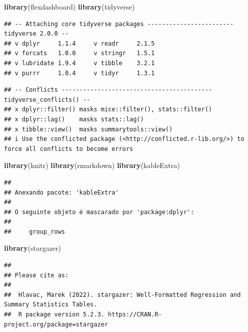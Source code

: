 \documentclass[
]{article}
\newenvironment{Shaded}{\begin{snugshade}}{\end{snugshade}}
\newcommand{\FunctionTok}[1]{\textcolor[rgb]{0.13,0.29,0.53}{\textbf{#1}}}
\newcommand{\NormalTok}[1]{#1}
\begin{document}
\begin{Shaded}
\begin{Highlighting}[]
\FunctionTok{library}\NormalTok{(flexdashboard)}
\FunctionTok{library}\NormalTok{(tidyverse)}
\end{Highlighting}
\end{Shaded}

\begin{verbatim}
## -- Attaching core tidyverse packages ------------------------ tidyverse 2.0.0 --
## v dplyr     1.1.4     v readr     2.1.5
## v forcats   1.0.0     v stringr   1.5.1
## v lubridate 1.9.4     v tibble    3.2.1
## v purrr     1.0.4     v tidyr     1.3.1
\end{verbatim}

\begin{verbatim}
## -- Conflicts ------------------------------------------ tidyverse_conflicts() --
## x dplyr::filter() masks mice::filter(), stats::filter()
## x dplyr::lag()    masks stats::lag()
## x tibble::view()  masks summarytools::view()
## i Use the conflicted package (<http://conflicted.r-lib.org/>) to force all conflicts to become errors
\end{verbatim}

\begin{Shaded}
\begin{Highlighting}[]
\FunctionTok{library}\NormalTok{(knitr)}
\FunctionTok{library}\NormalTok{(rmarkdown)}
\FunctionTok{library}\NormalTok{(kableExtra)}
\end{Highlighting}
\end{Shaded}

\begin{verbatim}
## 
## Anexando pacote: 'kableExtra'
## 
## O seguinte objeto é mascarado por 'package:dplyr':
## 
##     group_rows
\end{verbatim}

\begin{Shaded}
\begin{Highlighting}[]
\FunctionTok{library}\NormalTok{(stargazer)}
\end{Highlighting}
\end{Shaded}

\begin{verbatim}
## 
## Please cite as: 
## 
##  Hlavac, Marek (2022). stargazer: Well-Formatted Regression and Summary Statistics Tables.
##  R package version 5.2.3. https://CRAN.R-project.org/package=stargazer
\end{verbatim}
\end{document}
